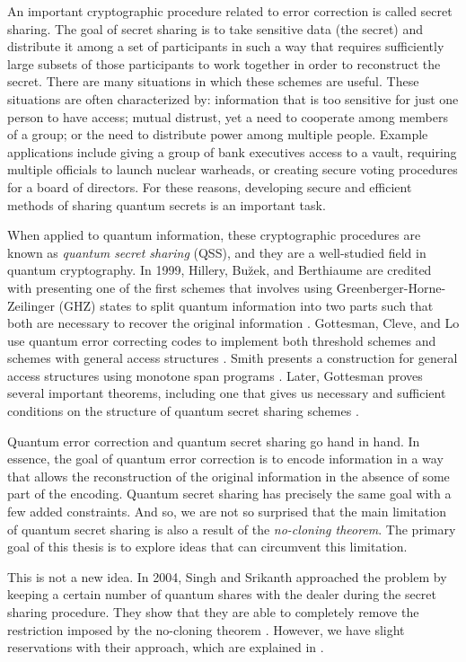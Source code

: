 An important cryptographic procedure related to error correction is called secret sharing. The goal of secret sharing is to take sensitive data (the secret) and distribute it among a set of participants in such a way that requires sufficiently large subsets of those participants to work together in order to reconstruct the secret. There are many situations in which these schemes are useful. These situations are often characterized by: information that is too sensitive for just one person to have access; mutual distrust, yet a need to cooperate among members of a group; or the need to distribute power among multiple people. Example applications include giving a group of bank executives access to a vault, requiring multiple officials to launch nuclear warheads, or creating secure voting procedures for a board of directors. For these reasons, developing secure and efficient methods of sharing quantum secrets is an important task. 

When applied to quantum information, these cryptographic procedures are known as \textit{quantum secret sharing} (QSS), and they are a well-studied field in quantum cryptography. In 1999, Hillery, Bu\u{z}ek, and Berthiaume are credited with presenting one of the first schemes that involves using Greenberger-Horne-Zeilinger (GHZ) states to split quantum information into two parts such that both are necessary to recover the original information \cite{hillery_quantum_1999}. Gottesman, Cleve, and Lo use quantum error correcting codes to implement both threshold schemes and schemes with general access structures \cite{cleve_how_1999}. Smith presents a construction for general access structures using monotone span programs \cite{smith_quantum_2000}. Later, Gottesman proves several important theorems, including one that gives us necessary and sufficient conditions on the structure of quantum secret sharing schemes \cite{gottesman_theory_2000}.

Quantum error correction and quantum secret sharing go hand in hand. In essence, the goal of quantum error correction is to encode information in a way that allows the reconstruction of the original information in the absence of some part of the encoding. Quantum secret sharing has precisely the same goal with a few added constraints. And so, we are not so surprised that the main limitation of quantum secret sharing is also a result of the \textit{no-cloning theorem}. The primary goal of this thesis is to explore ideas that can circumvent this limitation.

This is not a new idea. In 2004, Singh and Srikanth approached the problem by keeping a certain number of quantum shares with the dealer during the secret sharing procedure. They show that they are able to completely remove the restriction imposed by the no-cloning theorem \cite{singh_assisted_2004}. However, we have slight reservations with their approach, which are explained in . 

